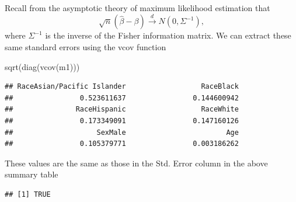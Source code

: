 \documentclass[
  ignorenonframetext,
]{beamer}
\newenvironment{Shaded}{\begin{snugshade}}{\end{snugshade}}
\newcommand{\DecValTok}[1]{\textcolor[rgb]{0.00,0.00,0.81}{#1}}
\newcommand{\FunctionTok}[1]{\textcolor[rgb]{0.00,0.00,0.00}{#1}}
\newcommand{\NormalTok}[1]{#1}
\newcommand{\SpecialCharTok}[1]{\textcolor[rgb]{0.00,0.00,0.00}{#1}}
\begin{document}
\begin{frame}[fragile]{}
\protect\hypertarget{section-8}{}
Recall from the asymptotic theory of maximum likelihood estimation that
\[
  \sqrt{n}(\hat\beta - \beta) \overset{d}{\to} N(0, \Sigma^{-1}),
\] where \(\Sigma^{-1}\) is the inverse of the Fisher information
matrix. We can extract these same standard errors using the vcov
function

\vspace{12pt}
\tiny

\begin{Shaded}
\begin{Highlighting}[]
\FunctionTok{sqrt}\NormalTok{(}\FunctionTok{diag}\NormalTok{(}\FunctionTok{vcov}\NormalTok{(m1)))}
\end{Highlighting}
\end{Shaded}

\begin{verbatim}
## RaceAsian/Pacific Islander                  RaceBlack 
##                0.523611637                0.144600942 
##               RaceHispanic                  RaceWhite 
##                0.173349091                0.147160126 
##                    SexMale                        Age 
##                0.105379771                0.003186262
\end{verbatim}

\vspace{12pt}
\normalsize

These values are the same as those in the Std. Error column in the above
summary table

\vspace{12pt}
\tiny

\begin{Shaded}
\end{Shaded}

\begin{verbatim}
## [1] TRUE
\end{verbatim}
\end{frame}
\end{document}
